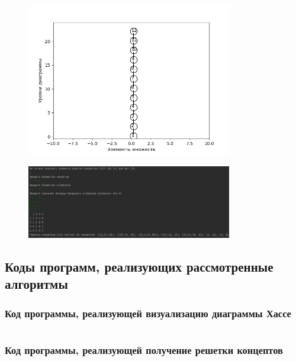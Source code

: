 \documentclass[bachelor, och, labwork]{shiza}
\begin{document}
        \begin{figure}[H]
            \centering
            \includegraphics[width=0.8\textwidth]{pic/7.png}
            \caption{}
        \end{figure}

        \begin{figure}[H]
            \centering
            \includegraphics[width=0.8\textwidth]{pic/8.png}
            \caption{}
        \end{figure}
    
    \subsection{Коды программ, реализующих рассмотренные алгоритмы}
        \subsubsection{Код программы, реализующей визуализацию диаграммы Хассе}
            \inputminted{python}{code/hassevisualization.py}
        \subsubsection{Код программы, реализующей получение решетки концептов}
            \inputminted{python}{code/latticeofconcepts.py}
\end{document}
